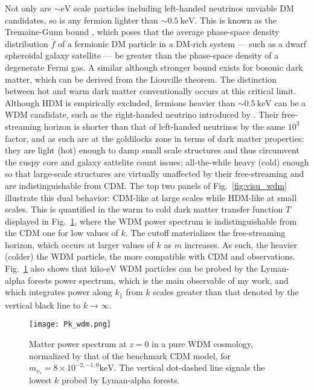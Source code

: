 Not only are $\sim \mathrm{eV}$ scale particles including left-handed neutrinos unviable DM candidates, so is any fermion lighter than $\sim 0.5~\mathrm{keV}$. This is known as the Tremaine-Gunn bound \citep{Tremaine-Gunn}, which poses that the average phase-space density distribution $\bar{f}$ of a fermionic DM particle in a DM-rich system --- such as a dwarf spheroidal galaxy satellite --- be greater than the phase-space density of a degenerate Fermi gas. A similar although stronger bound exists for bosonic dark matter, which can be derived from the Liouville theorem. The distinction between hot and warm dark matter conventionally occurs at this critical limit. Although HDM is empirically excluded, fermions heavier than $\sim 0.5~\mathrm{keV}$ can be a WDM candidate, such as the right-handed neutrino introduced by \cite{DodelsonWidrow94}. Their free-streaming horizon is shorter than that of left-handed neutrinos by the same $10^3$ factor, and as such are at the goldilocks zone in terms of dark matter properties: they are light (hot) enough to damp small scale structures and thus circumvent the cuspy core and galaxy sattelite count issues; all-the-while heavy (cold) enough so that large-scale structures are virtually unaffected by their free-streaming and are indistinguishable from CDM. The top two panels of Fig.~\ref{fig:visu_wdm} illustrate this dual behavior: CDM-like at large scales while HDM-like at small scales. This is quantified in the warm to cold dark matter transfer function $T$ displayed in Fig.~\ref{fig:pk_wdm}, where the WDM power spectrum is indistinguishable from the CDM one for low values of $k$. The cutoff materializes the free-streaming horizon, which occurs at larger values of $k$ as $m$ increases. As such, the heavier (colder) the WDM particle, the more compatible with CDM and observations. Fig.~\ref{fig:pk_wdm} also shows that kilo-$\mathrm{eV}$ WDM particles can be probed by the Lyman-alpha forests power spectrum, which is the main observable of my work, and which integrates power along $k_\parallel$ from $k$ scales greater than that denoted by the vertical black line to $k \rightarrow \infty$.  \\


\begin{figure}
\begin{center}
\texttt{[image: Pk\_wdm.png]}
\caption{Matter power spectrum at $z=0$ in a pure WDM cosmology, normalized by that of the benchmark CDM model, for $m_{\nu_s} = 8 \times 10^{-2, -1, 0}\mathrm{keV}$. The vertical dot-dashed line signals the lowest $k$ probed by Lyman-alpha forests.}
\label{fig:pk_wdm}
\end{center}
\end{figure}


